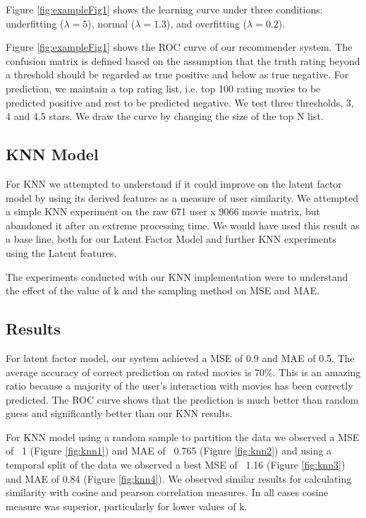 \documentclass[12pt]{article}
\begin{document}
Figure \ref{fig:exampleFig1} shows the learning curve under three conditions: underfitting ($\lambda = 5$), normal ($\lambda = 1.3$), and overfitting ($\lambda = 0.2$).

Figure \ref{fig:exampleFig1} shows the ROC curve of our recommender system. The confusion matrix is defined based on the assumption that the truth rating beyond a threshold should be regarded as true positive and below as true negative\cite{CF_Recsys_Survey}. For prediction, we maintain a top rating list, i.e. top 100 rating movies to be predicted positive and rest to be predicted negative. We test three thresholds, 3, 4 and 4.5 stars. We draw the curve by changing the size of the top N list.

\subsection{KNN Model}
For KNN we attempted to understand if it could improve on the latent factor model by using its derived features as a measure of user similarity. We attempted a simple KNN experiment on the raw 671 user x 9066 movie matrix, but abandoned it after an extreme processing time. We would have used this result as a base line, both for our Latent Factor Model and further KNN experiments using the Latent features.

The experiments conducted with our KNN implementation were to understand the effect of the value of k and the sampling method on MSE and MAE.

\subsection{Results}

For latent factor model, our system achieved a MSE of 0.9 and MAE of 0.5. The average accuracy of correct prediction on rated movies is 70\%. This is an amazing ratio because a majority of the user's interaction with movies has been correctly predicted. The ROC curve shows that the prediction is much better than random guess and significantly better than our KNN results.

For KNN model using a random sample to partition the data we observed a MSE of ~1 (Figure \ref{fig:knn1}) and MAE of ~0.765 (Figure \ref{fig:knn2}) and using a temporal split of the data we observed a best MSE of ~1.16 (Figure \ref{fig:knn3}) and MAE of 0.84 (Figure \ref{fig:knn4}). We observed similar results for calculating similarity with cosine and pearson correlation measures. In all cases cosine measure was superior, particularly for lower values of k.
\end{document}
